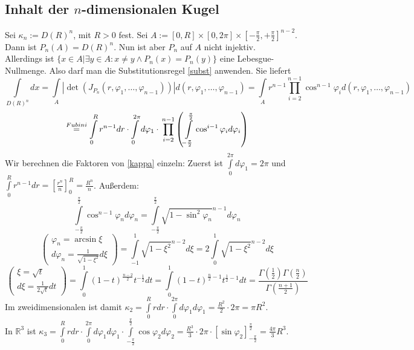 \documentclass[a4paper,11pt]{scrartcl}
\newcommand{\R}{{\ensuremath{\mathbb{R}}}}
\begin{document}
\subsection{Inhalt der $n$-dimensionalen Kugel}
Sei $\kappa_n:=D(R)^n$, mit $R>0$ fest. Sei $A:=[0,R]\times[0,2\pi]\times[-\frac{\pi}{2},+\frac{\pi}{2}]^{n-2}$. Dann ist $P_n(A)=D(R)^n$. Nun ist aber $P_n$ auf $A$ nicht injektiv.\\
Allerdings ist $\{x\in A|\exists y\in A: x\neq y \wedge P_n(x)=P_n(y)\}$ eine Lebesgue-Nullmenge. Also darf man die Substitutionsregel \eqref{subst} anwenden. Sie liefert
\[\int\limits_{D(R)^n}dx=\int\limits_A |\det(J_{P_n}(r,\varphi_1,\ldots,\varphi_{n-1}))|d(r,\varphi_1,\ldots,\varphi_{n-1})=
\int\limits_A r^{n-1}\prod\limits_{i=2}^{n-1}\cos^{n-1}\varphi_i d(r,\varphi_1,\ldots,\varphi_{n-1}) \]
\begin{equation}\label{kappa}\stackrel{Fubini}{=}\int\limits_0^R r^{n-1}dr\cdot\int\limits_0^{2\pi}d\varphi_1\cdot \\ \prod\limits_{i=2}^{n-1}\left(\int\limits_{-\frac{\pi}{2}}^\frac{\pi}{2} \cos^{i-1}\varphi_i d\varphi_i\right)
\end{equation}
Wir berechnen die Faktoren von \eqref{kappa} einzeln:
Zuerst ist $\int\limits_0^{2\pi}d\varphi_1=2\pi$ und $\int\limits_0^R r^{n-1}dr=\left[\frac{r^n}{n}\right]_0^R=\frac{R^n}{n}$. Außerdem:
$$\int\limits_{-\frac{\pi}{2}}^\frac{\pi}{2} \cos^{n-1}\varphi_n d\varphi_n=\int\limits_{-\frac{\pi}{2}}^\frac{\pi}{2} \sqrt{1-\sin^2\varphi_n}^{n-1} d\varphi_n$$
$$\left( \begin{array}{c} \varphi_n= \arcsin \xi \\ d\varphi_n = \frac{1}{\sqrt{1-\xi^2}}d\xi\end{array}\right)
=\int\limits_{-1}^1 \sqrt{1-\xi^2}^{n-2}d\xi=2\int\limits_0^1\sqrt{1-\xi^2}^{n-2}d\xi$$
$$\left( \begin{array}{c} \xi= \sqrt{t} \\ d\xi = \frac{1}{2\sqrt{t}}dt\end{array}\right)
=\int\limits_0^1 (1-t)^\frac{n-2}{2}t^{-\frac{1}{2}}dt = \int\limits_0^1 (1-t)^{\frac{n}{2}-1}t^{\frac{1}{2}-1}dt
=\frac{\Gamma(\frac{1}{2})\Gamma(\frac{n}{2})}{\Gamma(\frac{n+1}{2})}$$
Im zweidimensionalen ist damit $\kappa_2=\int\limits_0^R rdr\cdot \int\limits_0^{2\pi}d\varphi_1 d\varphi_1=\frac{R^2}{2}\cdot 2\pi=\pi R^2$.\\
In $\R^3$ ist $\kappa_3=\int\limits_0^R rdr\cdot \int\limits_0^{2\pi}d\varphi_1 d\varphi_1\cdot \int\limits_{-\frac{\pi}{2}}^\frac{\pi}{2} \cos\varphi_2 d\varphi_2=\frac{R^3}{3}\cdot 2\pi\cdot[\sin\varphi_2]_{-\frac{\pi}{2}}^\frac{\pi}{2}=\frac{4\pi}{3} R^3$.\\
\end{document}
